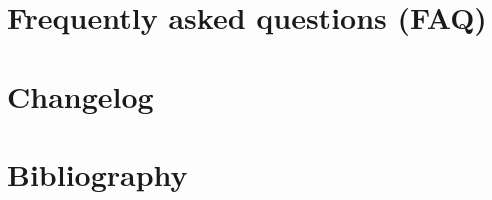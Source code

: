 \documentclass[letterpaper,10pt,openany,oneside]{sphinxmanual}
\begin{document}

\newpage
\chapter{Frequently asked questions (FAQ)}



\newpage
\chapter{Changelog}



\chapter{Bibliography}
\printbibliography[heading=none]




\renewcommand{\indexname}{Index}
\printindex
\end{document}
